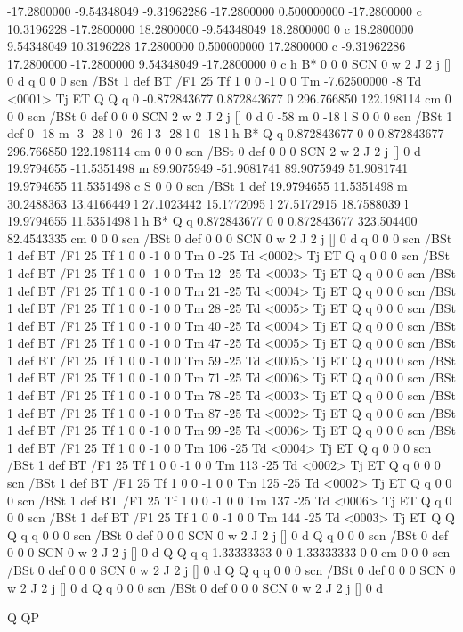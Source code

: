 -17.2800000 -9.54348049 -9.31962286 -17.2800000 0.500000000 -17.2800000 c
10.3196228 -17.2800000 18.2800000 -9.54348049 18.2800000 0 c
18.2800000 9.54348049 10.3196228 17.2800000 0.500000000 17.2800000 c
-9.31962286 17.2800000 -17.2800000 9.54348049 -17.2800000 0 c
h
B*
0 0 0 SCN
0 w 2 J 2 j [] 0 d
q
0 0 0 scn
/BSt 1 def
BT
/F1 25 Tf 1 0 0 -1 0 0 Tm
-7.62500000 -8 Td <0001> Tj
ET
Q
Q
q
0 -0.872843677 0.872843677 0 296.766850 122.198114 cm
0 0 0 scn
/BSt 0 def
0 0 0 SCN
2 w 2 J 2 j [] 0 d
0 -58 m
0 -18 l
S
0 0 0 scn
/BSt 1 def
0 -18 m
-3 -28 l
0 -26 l
3 -28 l
0 -18 l
h
B*
Q
q
0.872843677 0 0 0.872843677 296.766850 122.198114 cm
0 0 0 scn
/BSt 0 def
0 0 0 SCN
2 w 2 J 2 j [] 0 d
19.9794655 -11.5351498 m
89.9075949 -51.9081741 89.9075949 51.9081741 19.9794655 11.5351498 c
S
0 0 0 scn
/BSt 1 def
19.9794655 11.5351498 m
30.2488363 13.4166449 l
27.1023442 15.1772095 l
27.5172915 18.7588039 l
19.9794655 11.5351498 l
h
B*
Q
q
0.872843677 0 0 0.872843677 323.504400 82.4543335 cm
0 0 0 scn
/BSt 0 def
0 0 0 SCN
0 w 2 J 2 j [] 0 d
q
0 0 0 scn
/BSt 1 def
BT
/F1 25 Tf 1 0 0 -1 0 0 Tm
0 -25 Td <0002> Tj
ET
Q
q
0 0 0 scn
/BSt 1 def
BT
/F1 25 Tf 1 0 0 -1 0 0 Tm
12 -25 Td <0003> Tj
ET
Q
q
0 0 0 scn
/BSt 1 def
BT
/F1 25 Tf 1 0 0 -1 0 0 Tm
21 -25 Td <0004> Tj
ET
Q
q
0 0 0 scn
/BSt 1 def
BT
/F1 25 Tf 1 0 0 -1 0 0 Tm
28 -25 Td <0005> Tj
ET
Q
q
0 0 0 scn
/BSt 1 def
BT
/F1 25 Tf 1 0 0 -1 0 0 Tm
40 -25 Td <0004> Tj
ET
Q
q
0 0 0 scn
/BSt 1 def
BT
/F1 25 Tf 1 0 0 -1 0 0 Tm
47 -25 Td <0005> Tj
ET
Q
q
0 0 0 scn
/BSt 1 def
BT
/F1 25 Tf 1 0 0 -1 0 0 Tm
59 -25 Td <0005> Tj
ET
Q
q
0 0 0 scn
/BSt 1 def
BT
/F1 25 Tf 1 0 0 -1 0 0 Tm
71 -25 Td <0006> Tj
ET
Q
q
0 0 0 scn
/BSt 1 def
BT
/F1 25 Tf 1 0 0 -1 0 0 Tm
78 -25 Td <0003> Tj
ET
Q
q
0 0 0 scn
/BSt 1 def
BT
/F1 25 Tf 1 0 0 -1 0 0 Tm
87 -25 Td <0002> Tj
ET
Q
q
0 0 0 scn
/BSt 1 def
BT
/F1 25 Tf 1 0 0 -1 0 0 Tm
99 -25 Td <0006> Tj
ET
Q
q
0 0 0 scn
/BSt 1 def
BT
/F1 25 Tf 1 0 0 -1 0 0 Tm
106 -25 Td <0004> Tj
ET
Q
q
0 0 0 scn
/BSt 1 def
BT
/F1 25 Tf 1 0 0 -1 0 0 Tm
113 -25 Td <0002> Tj
ET
Q
q
0 0 0 scn
/BSt 1 def
BT
/F1 25 Tf 1 0 0 -1 0 0 Tm
125 -25 Td <0002> Tj
ET
Q
q
0 0 0 scn
/BSt 1 def
BT
/F1 25 Tf 1 0 0 -1 0 0 Tm
137 -25 Td <0006> Tj
ET
Q
q
0 0 0 scn
/BSt 1 def
BT
/F1 25 Tf 1 0 0 -1 0 0 Tm
144 -25 Td <0003> Tj
ET
Q
Q
Q q
q
0 0 0 scn
/BSt 0 def
0 0 0 SCN
0 w 2 J 2 j [] 0 d
Q
q
0 0 0 scn
/BSt 0 def
0 0 0 SCN
0 w 2 J 2 j [] 0 d
Q
Q q
q
1.33333333 0 0 1.33333333 0 0 cm
0 0 0 scn
/BSt 0 def
0 0 0 SCN
0 w 2 J 2 j [] 0 d
Q
Q q
q
0 0 0 scn
/BSt 0 def
0 0 0 SCN
0 w 2 J 2 j [] 0 d
Q
q
0 0 0 scn
/BSt 0 def
0 0 0 SCN
0 w 2 J 2 j [] 0 d

Q QP
